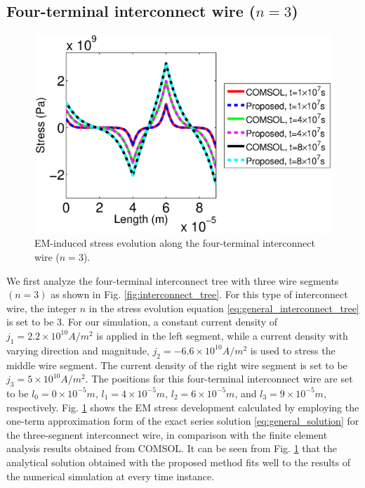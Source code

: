 \subsection{Four-terminal interconnect wire ($n=3$)}
\begin{figure}[!h]
\centering
\includegraphics[width=0.9\columnwidth]{S3StressMatComCompareT0.eps}
\caption{EM-induced stress evolution along the four-terminal interconnect wire ($n=3$).}
\label{fig:S3StressMatComCompare}
\end{figure}
We first analyze the four-terminal interconnect tree with three wire segments $(n=3)$ as shown in Fig. \ref{fig:interconnect_tree}. For this type of interconnect wire, the integer $n$ in the stress evolution equation \eqref{eq:general_interconnect_tree} is set to be 3. For our simulation, a constant current density of $j_1=2.2\times 10^{10}A/m^2$ is applied in the left segment, while a current density with varying direction and magnitude, $j_2=-6.6\times 10^{10}A/m^2$ is used to stress the middle wire segment. The current density of the right wire segment is set to be $j_3=5\times 10^{10}A/m^2$. The positions for this four-terminal interconnect wire are set to be $l_0=0\times 10^{-5}m$, $l_1=4\times 10^{-5}m$, $l_2=6\times 10^{-5}m$, and $l_3=9\times 10^{-5}m$, respectively. Fig. \ref{fig:S3StressMatComCompare} shows the EM stress development calculated by employing the one-term approximation form of the exact series solution \eqref{eq:general_solution} for the three-segment interconnect wire, in comparison with the finite element analysis results obtained from COMSOL. It can be seen from Fig. \ref{fig:S3StressMatComCompare} that the analytical solution obtained with the proposed method fits well to the results of the numerical simulation at every time instance.

